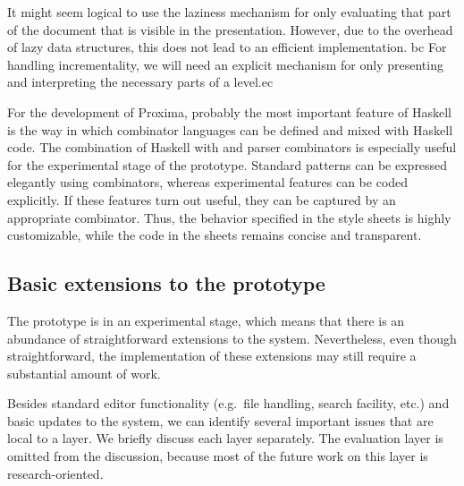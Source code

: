 \bc
It might seem logical to use the laziness mechanism for only evaluating that part of the document that is visible in the presentation. However, due to the overhead of lazy data structures, this does not lead to an efficient implementation. bc For handling incrementality, we will need an explicit mechanism for only presenting and interpreting the necessary parts of a level.ec 
\ec

For the development of Proxima, probably the most important feature of Haskell is the way in which combinator languages can be defined and mixed with Haskell code. The combination of Haskell with {\Xprez}  and parser combinators is especially useful for the experimental stage of the prototype. Standard patterns can be expressed elegantly using combinators, whereas experimental features can be coded explicitly. If these features turn out useful, they can be captured by an appropriate combinator. Thus, the behavior specified in the style sheets is highly customizable, while the code in the sheets remains concise and transparent.

\subsection{Basic extensions to the prototype}

The prototype is in an experimental stage, which means that there is an abundance of straightforward extensions to the system. Nevertheless, even though  straightforward, the implementation of these extensions may still require a substantial amount of work. 

Besides standard editor functionality (e.g.\  file handling, search facility, etc.) and basic updates to the system, we can identify several important issues that are local to a layer. We briefly discuss each layer separately. The evaluation layer is omitted from the discussion, because most of the future work on this layer is research-oriented.

%
%


